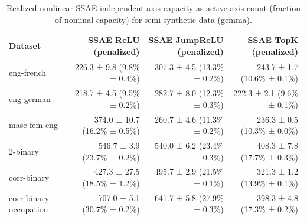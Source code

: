 \begin{table}[t]
\centering
\caption{Realized nonlinear SSAE independent-axis capacity as active-axis count (fraction of nominal capacity) for semi-synthetic data (gemma).}
\label{tab:semisynthetic-gemma-realized-active-axis-capacity}
\begin{tabular}{lrrr}
\toprule
Dataset & SSAE ReLU (penalized) & SSAE JumpReLU (penalized) & SSAE TopK (penalized) \\
\midrule
eng-french & 226.3 ± 9.8 (9.8\% ± 0.4\%) & 307.3 ± 4.5 (13.3\% ± 0.2\%) & 243.7 ± 1.7 (10.6\% ± 0.1\%) \\
eng-german & 218.7 ± 4.5 (9.5\% ± 0.2\%) & 282.7 ± 8.0 (12.3\% ± 0.3\%) & 222.3 ± 2.1 (9.6\% ± 0.1\%) \\
masc-fem-eng & 374.0 ± 10.7 (16.2\% ± 0.5\%) & 260.7 ± 4.6 (11.3\% ± 0.2\%) & 236.3 ± 0.5 (10.3\% ± 0.0\%) \\
2-binary & 546.7 ± 3.9 (23.7\% ± 0.2\%) & 540.0 ± 6.2 (23.4\% ± 0.3\%) & 408.3 ± 7.8 (17.7\% ± 0.3\%) \\
corr-binary & 427.3 ± 27.5 (18.5\% ± 1.2\%) & 495.7 ± 2.9 (21.5\% ± 0.1\%) & 321.3 ± 1.2 (13.9\% ± 0.1\%) \\
corr-binary-occupation & 707.0 ± 5.1 (30.7\% ± 0.2\%) & 641.7 ± 5.8 (27.9\% ± 0.3\%) & 398.3 ± 4.8 (17.3\% ± 0.2\%) \\
\bottomrule
\end{tabular}
\end{table}
